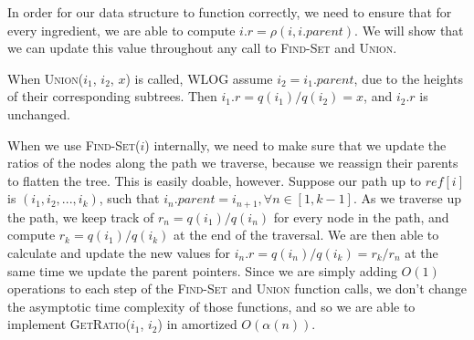 \documentclass{6046}
\begin{document}
In order for our data structure to function correctly,
we need to ensure that for every ingredient, we are
able to compute $i.r = \rho(i, i.parent)$. We will show
that we can update this value throughout any call
to \textsc{Find-Set} and \textsc{Union}.

When \textsc{Union($i_1$, $i_2$, $x$)} is called, WLOG assume
$i_2 = i_1.parent$, due to the heights of their corresponding
subtrees. Then $i_1.r = q(i_1) / q(i_2) = x$, and $i_2.r$ is
unchanged.

When we use \textsc{Find-Set($i$)} internally, we need to
make sure that we update the ratios of the nodes
along the path we traverse, because we reassign their parents
to flatten the tree. This is easily doable, however. Suppose
our path up to $ref[i]$ is $(i_1, i_2, ..., i_k)$, such that
$i_n.parent = i_{n+1}, \forall n \in [1, k - 1]$. As we
traverse up the path, we keep track of $r_n = q(i_1) / q(i_n)$ for
every node in the path, and compute $r_k = q(i_1) / q(i_k)$ at
the end of the traversal. We are then able to calculate
and update the new values for $i_n.r = q(i_n) / q(i_k) =
r_k / r_n$ at the same time we update the parent pointers. Since
we are simply adding $O(1)$ operations to each step of the
\textsc{Find-Set} and \textsc{Union} function calls, we don't change the 
asymptotic time complexity of those functions, and so we
are able to implement \textsc{GetRatio($i_1$, $i_2$)} in
amortized $O(\alpha(n))$.
\end{document}
